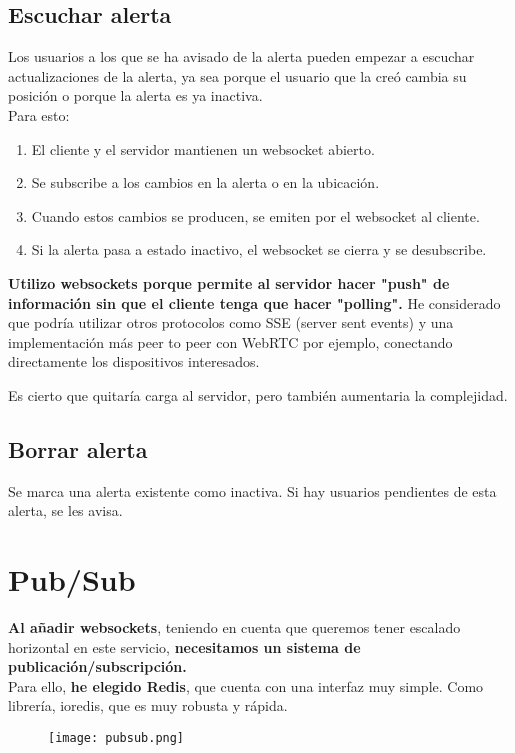 \subsection{Escuchar alerta}\label{subsec:websocket}
Los usuarios a los que se ha avisado de la alerta pueden empezar a escuchar actualizaciones de la alerta,
ya sea porque el usuario que la creó cambia su posición o porque la alerta es ya inactiva. \\
Para esto:
\begin{enumerate}
	\item El cliente y el servidor mantienen un websocket abierto.
	\item Se subscribe a los cambios en la alerta o en la ubicación.
	\item Cuando estos cambios se producen, se emiten por el websocket al cliente.
	\item Si la alerta pasa a estado inactivo, el websocket se cierra y se desubscribe.
\end{enumerate}
\textbf{Utilizo websockets porque permite al servidor hacer "push" de información sin que el cliente tenga que hacer "polling".}
He considerado que podría utilizar otros protocolos como SSE (server sent events) y una implementación más peer to peer con WebRTC por ejemplo, conectando directamente los dispositivos interesados.

Es cierto que quitaría carga al servidor, pero también aumentaria la complejidad.

\subsection{Borrar alerta}
Se marca una alerta existente como inactiva. Si hay usuarios pendientes de esta alerta, se les avisa.


\section{Pub/Sub}\label{sec:pubsub}
\textbf{Al añadir websockets}, teniendo en cuenta que queremos tener escalado horizontal en este servicio,
\textbf{necesitamos un sistema de publicación/subscripción.} \\
Para ello, \textbf{he elegido Redis}, que cuenta con una interfaz muy simple. Como librería, ioredis, 
que es muy robusta y rápida.\\

\begin{figure}[H]
	\centering	
	\texttt{[image: pubsub.png]}
	\end{figure}

